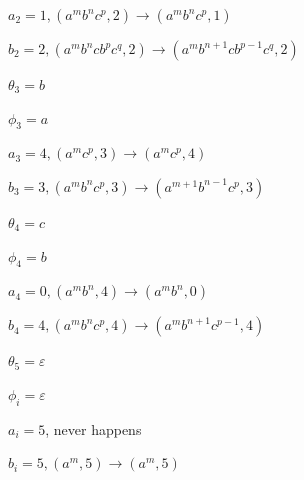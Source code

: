 \documentclass{article}
\begin{document}
\( a_{2} = 1, (a^{m}b^{n}c^{p}, 2) \to (a^{m}b^{n}c^{p}, 1) \)

\( b_{2} = 2, (a^{m}b^{n}cb^{p}c^{q}, 2) \to (a^{m}b^{n+1}cb^{p-1}c^{q}, 2) \)

\( \theta_{3} = b \)

\( \phi_{3} = a \)

\( a_{3} = 4, (a^{m}c^{p}, 3) \to (a^{m}c^{p}, 4) \)

\( b_{3} = 3, (a^{m}b^{n}c^{p}, 3) \to (a^{m + 1}b^{n-1}c^{p}, 3) \)

\( \theta_{4} = c \)

\( \phi_{4} = b \)

\( a_{4} = 0, (a^{m}b^{n}, 4) \to (a^{m}b^{n}, 0) \)

\( b_{4} = 4, (a^{m}b^{n}c^{p}, 4) \to (a^{m}b^{n+1}c^{p-1}, 4) \)

\( \theta_{5} = \varepsilon \)

\( \phi_{i} = \varepsilon \)

\( a_{i} = 5 \), never happens

\( b_{i} = 5, (a^{m}, 5) \to (a^{m}, 5) \)
\end{document}
